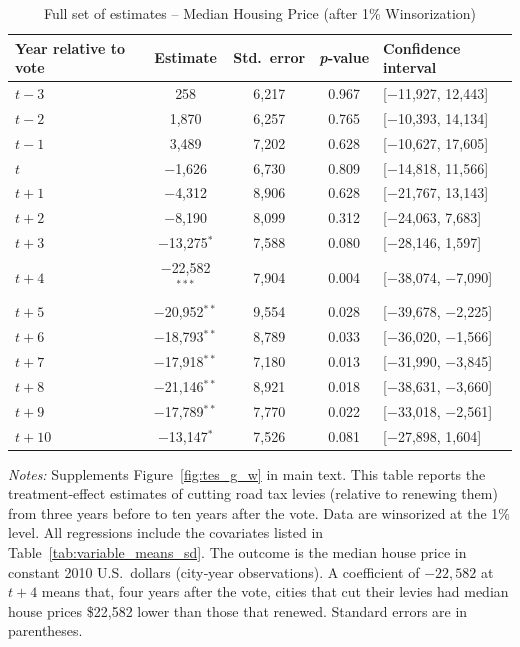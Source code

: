 \begin{table}[htbp]
    \centering
    \caption{Full set of estimates – Median Housing Price (after 1\% Winsorization)}
    \label{tab:median_sale_amount_winsorized}
    \begin{threeparttable}
    \begin{minipage}{\linewidth}
    \centering
    \begin{tabular}{p{3cm}cccl}
        \hline
        \textbf{Year relative to vote} & \textbf{Estimate} & \textbf{Std.~error} & \textbf{\textit{p}‐value} & \textbf{Confidence interval} \\
        \hline
        $t - 3$  & 258    & 6,217  & 0.967 & [$-$11,927, 12,443] \\
        $t - 2$  & 1,870  & 6,257  & 0.765 & [$-$10,393, 14,134] \\
        $t - 1$  & 3,489  & 7,202  & 0.628 & [$-$10,627, 17,605] \\
        $t$      & $-$1,626 & 6,730  & 0.809 & [$-$14,818, 11,566] \\
        $t + 1$  & $-$4,312 & 8,906  & 0.628 & [$-$21,767, 13,143] \\
        $t + 2$  & $-$8,190 & 8,099  & 0.312 & [$-$24,063, 7,683] \\
        $t + 3$  & $-$13,275$^{*}$ & 7,588  & 0.080 & [$-$28,146, 1,597] \\
        $t + 4$  & $-$22,582$^{***}$ & 7,904  & 0.004 & [$-$38,074, $-$7,090] \\
        $t + 5$  & $-$20,952$^{**}$ & 9,554  & 0.028 & [$-$39,678, $-$2,225] \\
        $t + 6$  & $-$18,793$^{**}$ & 8,789  & 0.033 & [$-$36,020, $-$1,566] \\
        $t + 7$  & $-$17,918$^{**}$ & 7,180  & 0.013 & [$-$31,990, $-$3,845] \\
        $t + 8$  & $-$21,146$^{**}$ & 8,921  & 0.018 & [$-$38,631, $-$3,660] \\
        $t + 9$  & $-$17,789$^{**}$ & 7,770  & 0.022 & [$-$33,018, $-$2,561] \\
        $t + 10$ & $-$13,147$^{*}$ & 7,526  & 0.081 & [$-$27,898, 1,604] \\
        \hline
    \end{tabular}
    \vspace{0.5em}
    \begin{tablenotes}[flushleft]
        \small
        \item \textit{Notes:} Supplements Figure~\ref{fig:tes_g_w} in main text. This table reports the treatment‐effect estimates of cutting road tax levies (relative to renewing them) from three years before to ten years after the vote. Data are winsorized at the 1\% level. All regressions include the covariates listed in Table~\ref{tab:variable_means_sd}. The outcome is the median house price in constant 2010 U.S.~dollars (city‐year observations). A coefficient of $-22{,}582$ at $t+4$ means that, four years after the vote, cities that cut their levies had median house prices \$22,582 lower than those that renewed. Standard errors are in parentheses.

\end{tablenotes}
\end{minipage}
\end{threeparttable}
\end{table}
